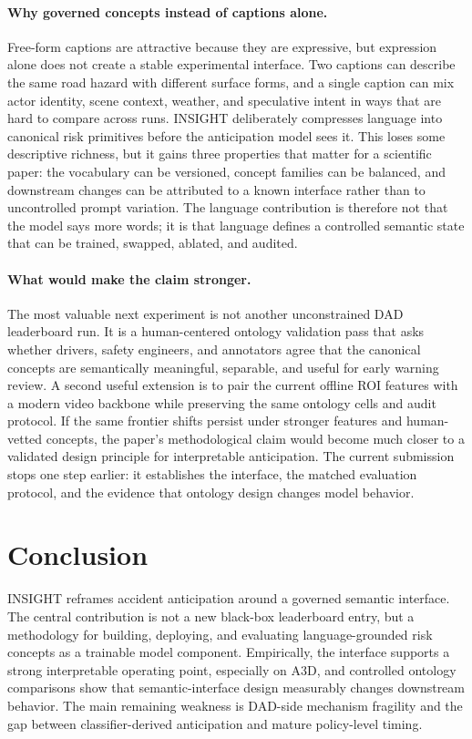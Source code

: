 \documentclass[11pt]{article}
\newcommand{\method}{\textsc{INSIGHT}}
\begin{document}
\paragraph{Why governed concepts instead of captions alone.}
Free-form captions are attractive because they are expressive, but expression
alone does not create a stable experimental interface. Two captions can describe
the same road hazard with different surface forms, and a single caption can mix
actor identity, scene context, weather, and speculative intent in ways that are
hard to compare across runs. \method{} deliberately compresses language into
canonical risk primitives before the anticipation model sees it. This loses some
descriptive richness, but it gains three properties that matter for a scientific
paper: the vocabulary can be versioned, concept families can be balanced, and
downstream changes can be attributed to a known interface rather than to
uncontrolled prompt variation. The language contribution is therefore not that
the model says more words; it is that language defines a controlled semantic
state that can be trained, swapped, ablated, and audited.

\paragraph{What would make the claim stronger.}
The most valuable next experiment is not another unconstrained DAD leaderboard
run. It is a human-centered ontology validation pass that asks whether drivers,
safety engineers, and annotators agree that the canonical concepts are
semantically meaningful, separable, and useful for early warning review. A
second useful extension is to pair the current offline ROI features with a
modern video backbone while preserving the same ontology cells and audit
protocol. If the same frontier shifts persist under stronger features and
human-vetted concepts, the paper's methodological claim would become much
closer to a validated design principle for interpretable anticipation. The
current submission stops one step earlier: it establishes the interface, the
matched evaluation protocol, and the evidence that ontology design changes
model behavior.

\FloatBarrier

\section{Conclusion}

\method{} reframes accident anticipation around a governed semantic interface.
The central contribution is not a new black-box leaderboard entry, but a
methodology for building, deploying, and evaluating language-grounded risk
concepts as a trainable model component. Empirically, the interface supports a
strong interpretable operating point, especially on A3D, and controlled ontology
comparisons show that semantic-interface design measurably changes downstream
behavior. The main remaining weakness is DAD-side mechanism fragility and the
gap between classifier-derived anticipation and mature policy-level timing.
\end{document}
